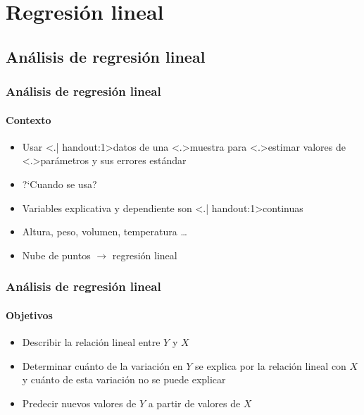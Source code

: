 \documentclass[gray,handout,mathserif]{beamer}
\begin{document}
\section{Regresi\'on lineal}

\subsection[Regresi\'on]{An\'alisis de regresi\'on lineal}
 
\begin{frame}[label=linreg1]
   \frametitle{An\'alisis de regresi\'on lineal}
   \framesubtitle{Contexto}
    \begin{itemize}[<+- | visible@+-| handout:1>]
      \item Usar \structure<.| handout:1>{datos} de una \structure<.>{muestra} para \structure<.>{estimar} valores de \structure<.>{par\'ametros} y sus errores est\'andar
      \item ?`Cuando se usa?
      \item Variables explicativa y dependiente son \alert<.| handout:1>{continuas}
      \item Altura, peso, volumen, temperatura \ldots
      \item Nube de puntos $\rightarrow$ regresi\'on lineal
   \end{itemize}
\end{frame}%

 
\begin{frame}[label=linreg2]
   \frametitle{An\'alisis de regresi\'on lineal}
   \framesubtitle{Objetivos}
    \begin{itemize}[<+-| handout:1>]
      \item Describir la relaci\'on lineal entre $Y$ y $X$
      \item Determinar cu\'anto de la variaci\'on en $Y$ se explica por la relaci\'on lineal con $X$ y cu\'anto de esta variaci\'on no se puede explicar
      \item Predecir nuevos valores de $Y$ a partir de valores de $X$
   \end{itemize}
\end{frame}%
\end{document}

